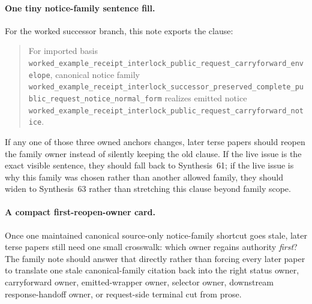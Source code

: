 \documentclass[11pt]{article}
\begin{document}
\paragraph{One tiny notice-family sentence fill.}
For the worked successor branch, this note exports the clause:
\begin{quote}\small
For imported basis \nolinkurl{worked_example_receipt_interlock_public_request_carryforward_envelope}, canonical notice family \nolinkurl{worked_example_receipt_interlock_successor_preserved_complete_public_request_notice_normal_form} realizes emitted notice \nolinkurl{worked_example_receipt_interlock_public_request_carryforward_notice}.
\end{quote}
If any one of those three owned anchors changes, later terse papers should reopen the family owner instead of silently keeping the old clause. If the live issue is the exact visible sentence, they should fall back to Synthesis~61; if the live issue is why this family was chosen rather than another allowed family, they should widen to Synthesis~63 rather than stretching this clause beyond family scope.\cite{series:workedexample}

\paragraph{A compact first-reopen-owner card.}
Once one maintained canonical source-only notice-family shortcut goes stale, later terse papers still need one small crosswalk: which owner regains authority \emph{first}? The family note should answer that directly rather than forcing every later paper to translate one stale canonical-family citation back into the right status owner, carryforward owner, emitted-wrapper owner, selector owner, downstream response-handoff owner, or request-side terminal cut from prose.
\end{document}
